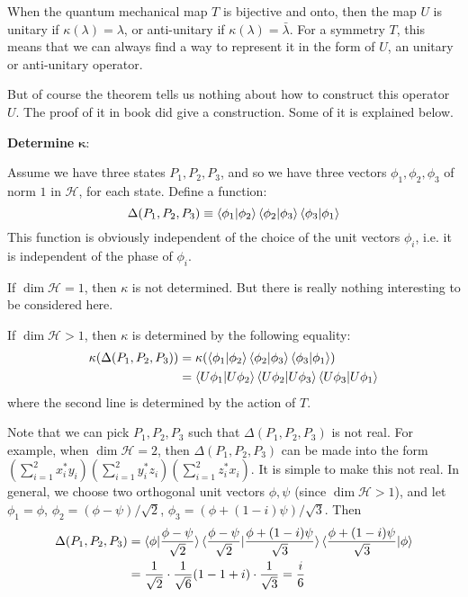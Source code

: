 \documentclass{article}
\begin{document}
\begin{remark}
    When the quantum mechanical map $T$ is bijective and onto, then the map $U$
    is unitary if $\kappa(\lambda)=\lambda$, or anti-unitary if
    $\kappa(\lambda)=\bar{\lambda}$. For a symmetry $T$, this means that we can
    always find a way to represent it in the form of $U$, an unitary or
    anti-unitary operator.
\end{remark}

But of course the theorem tells us nothing about how to construct this operator
$U$. The proof of it in book\cite{sternberg1995group} did give a construction. Some of it
is explained below.

\textbf{Determine} $\mathbf{\kappa}$:

Assume we have three states $P_1,P_2,P_3$, and so we have three vectors
$\phi_1,\phi_2,\phi_3$ of norm $1$ in $\mathscr{H}$, for each state. Define a
function:
\begin{equation}
    \Delta(P_1,P_2,P_3) \equiv 
        \braket{\phi_1|\phi_2}\braket{\phi_2|\phi_3}\braket{\phi_3|\phi_1}
\end{equation}
This function is obviously independent of the choice of the unit vectors
$\phi_i$, i.e. it is independent of the phase of $\phi_i$.

If $\dim\mathscr{H}=1$, then $\kappa$ is not determined. But there is
really nothing interesting to be considered here.

If $\dim\mathscr{H}>1$, then $\kappa$ is determined by the following equality:
\begin{align}
    \kappa(\Delta(P_1,P_2,P_3)) &= 
    \kappa(
        \braket{\phi_1|\phi_2}\braket{\phi_2|\phi_3}\braket{\phi_3|\phi_1}
    ) \\
    &= \braket{U\phi_1|U\phi_2}\braket{U\phi_2|U\phi_3}\braket{U\phi_3|U\phi_1}
\end{align}
where the second line is determined by the action of $T$.

Note that we can pick $P_1,P_2,P_3$ such that
$\Delta(P_1,P_2,P_3)$ is not real. For example, when $\dim\mathscr{H}=2$, then
$\Delta(P_1,P_2,P_3)$ can be made into the form 
$(\sum_{i=1}^2 x_i^*y_i)(\sum_{i=1}^2 y_i^*z_i)(\sum_{i=1}^2 z_i^*x_i)$. It
is simple to make this not real. In general, we choose two orthogonal unit
vectors $\phi,\psi$ (since $\dim\mathscr{H}>1$), and let $\phi_1=\phi$,
$\phi_2=(\phi-\psi)/\sqrt{2}$, $\phi_3=(\phi+(1-i)\psi)/\sqrt{3}$. Then
\begin{align*}
    \Delta(P_1,P_2,P_3) &=
    \braket{\phi|\frac{\phi-\psi}{\sqrt{2}}}
    \braket{\frac{\phi-\psi}{\sqrt{2}}|\frac{\phi+(1-i)\psi}{\sqrt{3}}}
    \braket{\frac{\phi+(1-i)\psi}{\sqrt{3}}|\phi} \\
    &= \frac{1}{\sqrt{2}}\cdot \frac{1}{\sqrt{6}}(1-1+i)\cdot\frac{1}{\sqrt{3}}
    =\frac{i}{6}
\end{align*}
\end{document}
